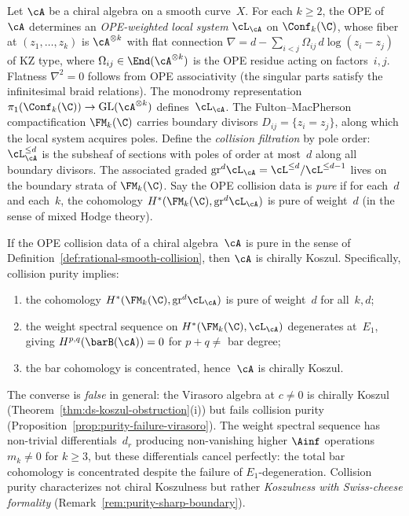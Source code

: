\begin{definition}
\label{def:rational-smooth-collision}
Let $\cA$ be a chiral algebra on a smooth curve~$X$. For each
$k \geq 2$, the OPE of~$\cA$ determines an \emph{OPE-weighted
local system} $\cL_{\cA}$ on $\Conf_k(\C)$, whose fiber at
$(z_1,\ldots,z_k)$ is $\cA^{\otimes k}$ with flat connection
$\nabla = d - \sum_{i<j} \Omega_{ij}\, d\log(z_i - z_j)$
of KZ type, where $\Omega_{ij} \in \End(\cA^{\otimes k})$ is
the OPE residue acting on factors~$i,j$. Flatness
$\nabla^2 = 0$ follows from OPE associativity
(the singular parts satisfy the infinitesimal braid relations).
The monodromy representation $\pi_1(\Conf_k(\C)) \to
\mathrm{GL}(\cA^{\otimes k})$ defines~$\cL_{\cA}$. The Fulton--MacPherson
compactification $\FM_k(\C)$ carries boundary divisors
$D_{ij} = \{z_i = z_j\}$, along which the local system acquires
poles. Define the \emph{collision filtration} by pole order:
$\cL^{\leq d}_{\cA}$ is the subsheaf of sections with poles of
order at most~$d$ along all boundary divisors. The associated
graded $\mathrm{gr}^d\cL_{\cA} = \cL^{\leq d}/\cL^{\leq d-1}$
lives on the boundary strata of $\FM_k(\C)$.
Say the OPE collision data is \emph{pure} if for each~$d$ and
each~$k$, the cohomology $H^*(\FM_k(\C), \mathrm{gr}^d\cL_{\cA})$
is pure of weight~$d$ (in the sense of mixed Hodge theory).
\end{definition}

\begin{proposition}
\label{prop:purity-koszul}
\label{prop:collision-purity-implies-koszul}
If the OPE collision data of a chiral algebra~$\cA$ is pure in the
sense of Definition~\ref{def:rational-smooth-collision}, then
$\cA$ is chirally Koszul. Specifically, collision purity implies:
\begin{enumerate}[label=\textup{(\alph*)}]
\item the cohomology $H^*(\FM_k(\C), \mathrm{gr}^d\cL_{\cA})$
 is pure of weight~$d$ for all~$k,d$;
\item the weight spectral sequence on $H^*(\FM_k(\C),
 \cL_{\cA})$ degenerates at~$E_1$, giving
 $H^{p,q}(\barB(\cA)) = 0$ for $p + q \neq$ bar degree;
\item the bar cohomology is concentrated, hence~$\cA$ is chirally
 Koszul.
\end{enumerate}
The converse is \emph{false} in general: the Virasoro algebra at
$c \neq 0$ is chirally Koszul
\textup{(}Theorem~\textup{\ref{thm:ds-koszul-obstruction}(i))} but
fails collision purity
\textup{(}Proposition~\textup{\ref{prop:purity-failure-virasoro})}.
The weight spectral sequence has non-trivial differentials~$d_r$
producing non-vanishing higher $\Ainf$ operations $m_k \neq 0$ for
$k \geq 3$, but these differentials cancel perfectly: the total
bar cohomology is concentrated despite the failure of
$E_1$-degeneration. Collision purity characterizes not chiral
Koszulness but rather \emph{Koszulness with Swiss-cheese formality}
\textup{(}Remark~\textup{\ref{rem:purity-sharp-boundary})}.
\end{proposition}

